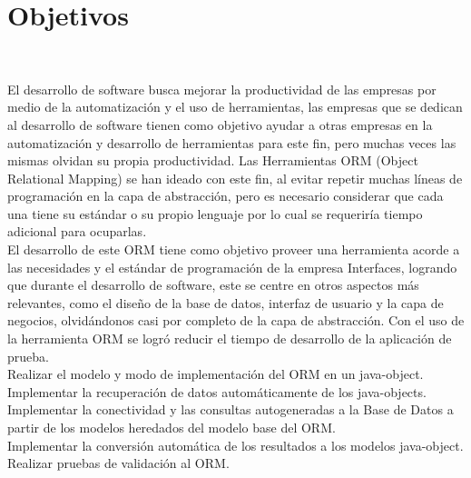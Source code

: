 \section{Objetivos} 
\textbf{}\\
\begin{flushright}


\begin{itemize}
El desarrollo de software busca mejorar la productividad de las empresas por medio de la automatización y el uso de herramientas, las empresas que se dedican al desarrollo de software tienen como objetivo ayudar a otras empresas en la automatización y desarrollo de herramientas para este fin, pero muchas veces las mismas olvidan su propia productividad. Las Herramientas ORM (Object  Relational  Mapping) se han ideado con este fin, al evitar repetir muchas líneas de programación en la capa de abstracción, pero es necesario considerar que cada una tiene su estándar o su propio lenguaje por lo cual se requeriría tiempo adicional para ocuparlas.  \textbf{}\\

El desarrollo de este ORM tiene como objetivo proveer una herramienta acorde a las necesidades y el estándar de programación de la empresa Interfaces, logrando  que durante el desarrollo de software, este se centre en otros aspectos más relevantes, como el diseño de la base de datos, interfaz de usuario y la capa de negocios, olvidándonos casi por completo de la capa de abstracción. Con el uso de la herramienta ORM se logró reducir el tiempo de desarrollo de la aplicación de prueba. \textbf{}\\

Realizar el modelo y modo de implementación del ORM en un java-object. \textbf{}\\
Implementar la recuperación de datos automáticamente de los java-objects. \textbf{}\\
Implementar la conectividad y las consultas autogeneradas a la Base de Datos a partir de los modelos heredados del modelo base del ORM. \textbf{}\\
Implementar la conversión automática de los resultados a los modelos java-object. \textbf{}\\
Realizar pruebas de validación al ORM. \textbf{}\\



\end{itemize} 


\end{flushright}